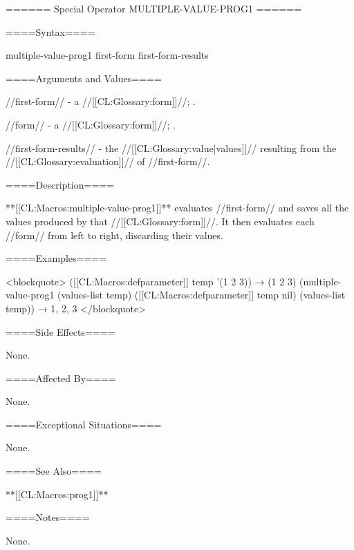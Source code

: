 ====== Special Operator MULTIPLE-VALUE-PROG1 ======

====Syntax====

\DefspecWithValues multiple-value-prog1 {first-form } {first-form-results}

====Arguments and Values====

//first-form// - a //[[CL:Glossary:form]]//; \evalspecial.

//form// - a //[[CL:Glossary:form]]//; \evalspecial.

//first-form-results// - the //[[CL:Glossary:value|values]]// resulting from the //[[CL:Glossary:evaluation]]// of //first-form//.

====Description====

**[[CL:Macros:multiple-value-prog1]]** evaluates //first-form// and saves all the values produced by that //[[CL:Glossary:form]]//. It then evaluates each //form// from left to right, discarding their values.

====Examples====

<blockquote> ([[CL:Macros:defparameter]] temp '(1 2 3)) → (1 2 3) (multiple-value-prog1 (values-list temp) ([[CL:Macros:defparameter]] temp nil) (values-list temp)) → 1, 2, 3 </blockquote>

====Side Effects====

None.

====Affected By====

None.

====Exceptional Situations====

None.

====See Also====

**[[CL:Macros:prog1]]**

====Notes====

None.

